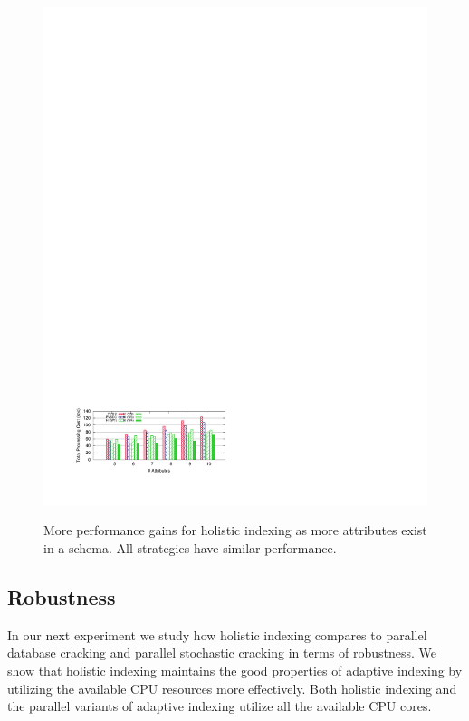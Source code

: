 \begin{figure}[ht]
\begin{center}
{            \includegraphics[trim=1.8cm 2.2cm 11cm 22cm]{Figures/holistic/skew_per_ma}
        }%
\vspace{-0.2 in}
   \caption{%
	More performance gains for holistic indexing as more attributes exist in a schema. All strategies have similar performance.
     }%
\vspace{-0.7 cm}
    \label{fig:hvsc}
    \end{center}
\end{figure}

\subsection{Robustness}
\label{subsec:robustness}

In our next experiment we study how holistic indexing compares to parallel database cracking and parallel stochastic cracking
in terms of robustness.
We show that holistic indexing maintains the good properties of adaptive indexing by utilizing the available CPU resources more effectively.
Both holistic indexing and the parallel variants of adaptive indexing utilize all the available CPU cores.

